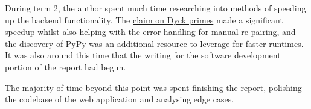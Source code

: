 During term 2, the author spent much time researching into methods of speeding up the backend functionality. The \hyperref[claim:samePrime]{claim on Dyck primes} made a significant speedup whilst also helping with the error handling for manual re-pairing, and the discovery of PyPy was an additional resource to leverage for faster runtimes. It was also around this time that the writing for the software development portion of the report had begun. 

The majority of time beyond this point was spent finishing the report, polishing the codebase of the web application and analysing edge cases.